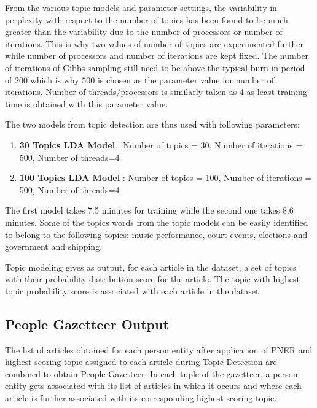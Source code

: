 From the various topic models and parameter settings, the variability in perplexity with respect to the number of topics has been found to be much greater than the variability due to the number of processors or number of iterations. This is why two values of number of topics are experimented further while number of processors and number of iterations are kept fixed. The number of iterations of Gibbs sampling still need to be above the typical burn-in period of $200$ which is why $500$ is chosen as the parameter value for number of iterations. Number of threads/processors is similarly taken as 4 as least training time is obtained with this parameter value. 

The two models from topic detection are thus used with following parameters:
\begin{enumerate}
 \item \textbf{30 Topics LDA Model} : Number of topics = 30, Number of iterations = 500, Number of threads=4
 \item \textbf{100 Topics LDA Model} : Number of topics = 100, Number of iterations = 500, Number of threads=4
\end{enumerate}
The first model takes 7.5 minutes for training while the second one takes 8.6 minutes.
Some of the topics words from the topic models can be easily identified to belong to the following topics: music performance, court events, elections and government and shipping.

Topic modeling gives as output, for each article in the dataset, a set of topics with their probability distribution score for the article. The topic with highest topic probability score is associated with each article in the dataset. 


\subsection{People Gazetteer Output }
\label{gaz:result}

The list of articles obtained for each person entity after application of PNER and highest scoring topic assigned to each article during Topic Detection are combined to obtain People Gazetteer. In each tuple of the gazetteer, a person entity gets associated with its list of articles in which it occurs and where each article is further associated with its corresponding highest scoring topic.


